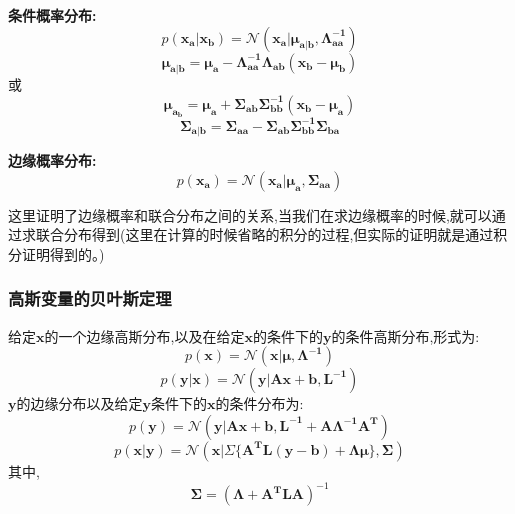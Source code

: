 \documentclass[UTF8,a4paper]{ctexart}
\begin{document}
            \textbf{条件概率分布:}
            \begin{equation}
                p(\bm{x_a}|\bm{x_b}) = \mathcal{N}(\bm{x_a}|\bm{\mu_{a|b}},\bm{\Lambda_{aa}^{-1}})
            \end{equation}
            \begin{equation}
                \bm{\mu_{a|b}} = \bm{\mu_a} - \bm{\Lambda_{aa}^{-1}\Lambda_{ab}(x_b - \mu_b)}
            \end{equation}
            或
            \begin{equation}
                \bm{\mu_{a_b}} = \bm{\mu_a + \Sigma_{ab}\Sigma_{bb}^{-1}(x_b - \mu_a)}
            \end{equation}
            \begin{equation}
                \bm{\Sigma_{a|b}= \Sigma_{aa} - \Sigma_{ab}\Sigma_{bb}^{-1}\Sigma_{ba}}
            \end{equation}

            \textbf{边缘概率分布:}
            \begin{equation}
                p(\bm{x_a}) = \mathcal{N}(\bm{x_a|\mu_a,\Sigma_{aa}})
            \end{equation}

            {\color{blue}这里证明了边缘概率和联合分布之间的关系,当我们在求边缘概率的时候,就可以通过求联合分布得到(这里在计算的时候省略的积分的过程,但实际的证明就是通过积分证明得到的。)}

            \subsubsection{高斯变量的贝叶斯定理}

            给定$\bm{x}$的一个边缘高斯分布,以及在给定$\bm{x}$的条件下的$\bm{y}$的条件高斯分布,形式为:
            \begin{equation}
                p(\bm{x}) = \mathcal{N}(\bm{x}|\bm{\mu},\bm{\Lambda^{-1}})
            \end{equation}
            \begin{equation}
                p(\bm{y}|\bm{x}) = \mathcal{N}(\bm{y}|\bm{Ax + b,L^{-1}})
            \end{equation}
            $\bm{y}$的边缘分布以及给定$\bm{y}$条件下的$\bm{x}$的条件分布为:
            \begin{equation}
                p(\bm{y}) = \mathcal{N}(\bm{y}|\bm{Ax + b,L^{-1} + A\Lambda^{-1}A^{T}})
            \end{equation}
            \begin{equation}
                p(\bm{x|y}) = \mathcal{N}(\bm{x}|\Sigma\{\bm{A^TL(y-b)+\Lambda\mu}\},\bm{\Sigma})
            \end{equation}
            其中,
            \begin{equation}
                \bm{\Sigma} = (\bm{\Lambda + A^TLA})^{-1}
            \end{equation}
\end{document}
